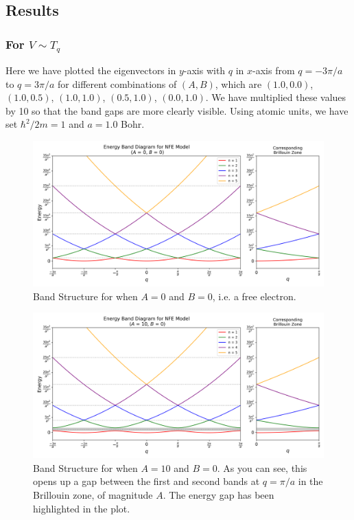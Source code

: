 \documentclass[12pt,a4paper]{article}
\begin{document}
\subsection{Results}
\subsubsection{For $V \sim T_q$}

Here we have plotted the eigenvectors in $y$-axis with $q$ in $x$-axis from $q = -3 \pi/a$ to $q= 3\pi/a$  for different combinations of $(A,B)$, which are
$(1.0, 0.0)$, $(1.0,0.5)$, $(1.0,1.0)$, $(0.5,1.0)$, $(0.0,1.0)$. We have multiplied these values by 10 so that the band gaps are more clearly visible.
Using atomic units, we have set $\hbar^2/2m = 1$ and $a=1.0$ Bohr.

\begin{figure}[H]
    \centering
    \includegraphics[width=1\linewidth]{images/1.png}
    \caption{Band Structure for when $A=0$ and $B=0$, i.e. a free electron.}
    \label{1}
\end{figure}

\begin{figure}[H]
    \centering
    \includegraphics[width=1\linewidth]{images/2.png}
    \caption{Band Structure for when $A=10$ and $B=0$. As you can see, this opens up a gap between the first and second bands at $q=\pi/a$ in the Brillouin zone, of magnitude $A$. The energy gap has been highlighted in the plot.}
    \label{2}
\end{figure}
\end{document}
